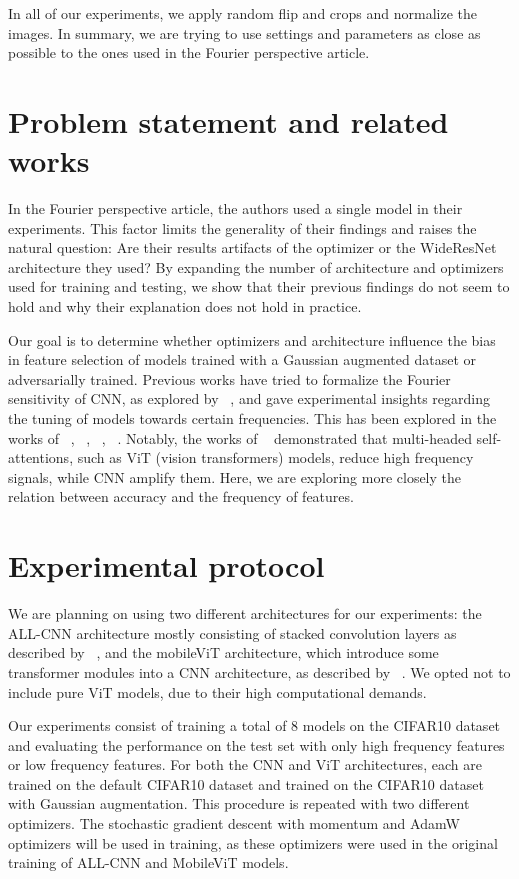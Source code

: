 \documentclass{article} \author{Simon Théorêt}
\begin{document}
In all of our experiments, we apply random flip and crops and
normalize the images. In summary, we are trying to use settings and
parameters as close as possible to the ones used in the Fourier
perspective article.

\section{Problem statement and related works}
In the Fourier perspective article, the authors used a single model in
their experiments. This factor limits the generality of their findings
and raises the natural question: Are their results artifacts of the
optimizer or the WideResNet architecture they used? By expanding the
number of architecture and optimizers used for training and testing,
we show that their previous findings do not seem to hold and why their
explanation does not hold in practice.

Our goal is to determine whether optimizers and architecture influence
the bias in feature selection of models trained with a Gaussian
augmented dataset or adversarially trained. Previous works have tried
to formalize the Fourier sensitivity of CNN, as explored by
~\citep{krishnamachari2023fourier}, and gave experimental insights
regarding the tuning of models towards certain frequencies. This has
been explored in the works of ~\citep{krishnamachari2023fourier},
~\citep{geirhos2022imagenettrained}, ~\citep{yin2020fourier},
~\citep{mo2022adversarial}. Notably, the works of
~\citep{park2022vision} demonstrated that multi-headed
self-attentions, such as ViT (vision transformers) models, reduce high
frequency signals, while CNN amplify them. Here, we are exploring more
closely the relation between accuracy and the frequency of features.

\section{Experimental protocol}
We are planning on using two different architectures for our
experiments: the ALL-CNN architecture mostly consisting of stacked
convolution layers as described by ~\citep{springenberg2015striving},
and the mobileViT architecture, which introduce some transformer
modules into a CNN architecture, as described by
~\citep{mehta2022mobilevit}. We opted not to include pure ViT models,
due to their high computational demands.

Our experiments consist of training a total of 8 models on the CIFAR10
dataset and evaluating the performance on the test set with only high
frequency features or low frequency features. For both the CNN and ViT
architectures, each are trained on the default CIFAR10 dataset and
trained on the CIFAR10 dataset with Gaussian augmentation. This
procedure is repeated with two different optimizers. The stochastic
gradient descent with momentum and AdamW optimizers will be used in
training, as these optimizers were used in the original training of
ALL-CNN and MobileViT models.
\end{document}
